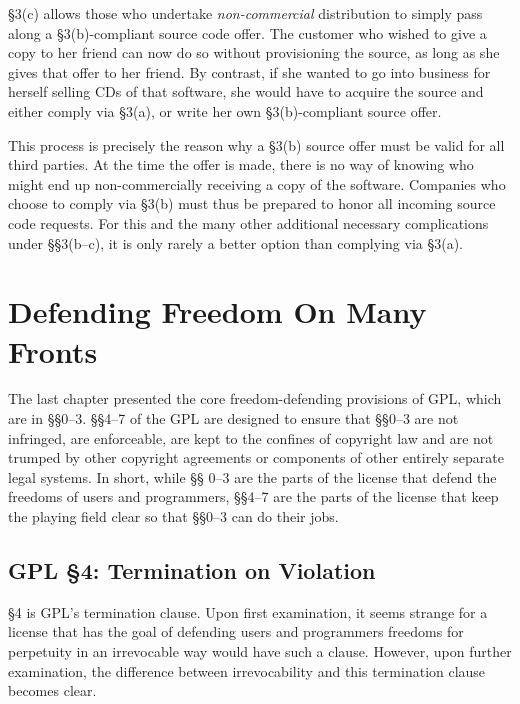 \documentclass[12pt]{report}
\begin{document}
\S 3(c) allows those who undertake \emph{non-commercial} distribution to
simply pass along a \S 3(b)-compliant source code offer.  The customer who
wished to give a copy to her friend can now do so without provisioning the
source, as long as she gives that offer to her friend.  By contrast, if
she wanted to go into business for herself selling CDs of that software,
she would have to acquire the source and either comply via \S 3(a), or
write her own \S 3(b)-compliant source offer.

This process is precisely the reason why a \S 3(b) source offer must be
valid for all third parties.  At the time the offer is made, there is no
way of knowing who might end up non-commercially receiving a copy of the
software.  Companies who choose to comply via \S 3(b) must thus be
prepared to honor all incoming source code requests.  For this and the
many other additional necessary complications under \S\S 3(b--c), it is
only rarely a better option than complying via \S 3(a).


\chapter{Defending Freedom On Many Fronts}

The last chapter presented the core freedom-defending provisions of GPL\@,
which are in \S\S 0--3.  \S\S 4--7 of the GPL are designed to ensure that
\S\S 0--3 are not infringed, are enforceable, are kept to the confines of
copyright law and are not trumped by other copyright agreements or
components of other entirely separate legal systems.  In short, while \S\S
0--3 are the parts of the license that defend the freedoms of users and
programmers, \S\S 4--7 are the parts of the license that keep the playing
field clear so that \S\S 0--3 can do their jobs.

\section{GPL \S 4: Termination on Violation}
\label{GPLs4}

\S 4 is GPL's termination clause.  Upon first examination, it seems
strange for a license that has the goal of defending users and programmers
freedoms for perpetuity in an irrevocable way would have such a clause.
However, upon further examination, the difference between irrevocability
and this termination clause becomes clear.
\end{document}
